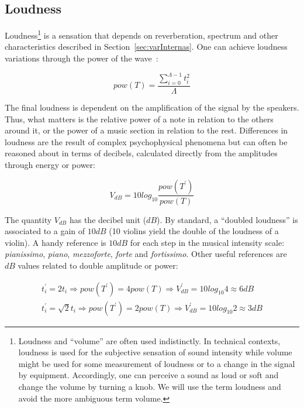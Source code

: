 \subsection{Loudness}\label{subsec:volume}
Loudness\footnote{Loudness and ``volume'' are often used indistinctly.
In technical contexts, loudness is used for the subjective sensation of sound intensity
while volume might be used for some measurement of loudness or to a change
in the signal by equipment.
Accordingly, one can perceive a sound as loud or soft and change the volume
by turning a knob.
We will use the term loudness and avoid the more ambiguous term volume.} is a sensation that depends on reverberation,
spectrum and other characteristics described in Section~\ref{sec:varInternas}.
One can achieve loudness variations through the power of the wave~\cite{Chowning}:

\begin{equation}\label{eq:potencia}
pow(T)=\frac{\sum_{i=0}^{\Lambda -1} t_i^2}{\Lambda}
\end{equation} 

The final loudness is dependent on the amplification of the signal by the speakers. Thus, what matters is the relative power of a note in relation to the others around it, or the power of a music section in relation to the rest. Differences in loudness are the result of complex psychophysical phenomena but can often be reasoned about in terms of decibels, calculated directly from the amplitudes through energy or power:

\begin{equation}\label{decibels}
V_{dB}=10log_{10}\frac{pow(T^{'})}{pow(T)}
\end{equation}

The quantity $V_{dB}$ has the decibel unit ($dB$). 
By standard, a ``doubled loudness'' is associated to a gain of $10dB$ (10 violins yield the double of the loudness of a violin).
A handy reference is $10dB$ for each step in the musical intensity scale: \emph{pianissimo}, \emph{piano}, \emph{mezzoforte}, \emph{forte} and \emph{fortissimo}. Other useful references are $dB$ values related to double amplitude or power:

\begin{align}
t_i^{'}=2 t_i \Rightarrow pow(T^{'})=4 pow(T) \Rightarrow V^{'}_{dB}=10log_{10} 4 \approx 6 dB \label{eq:ampVol}\\
t_i^{'}=\sqrt{2} t_i \Rightarrow pow(T^{'})=2 pow(T) \Rightarrow V^{'}_{dB}=10log_{10} 2 \approx 3 dB\label{eq:potVol}
\end{align}

